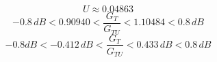 \[
	U \approx	0.04863
\]
\[
-0.8 \,dB < 0.90940 < \frac{G_T}{G_{TU}} < 1.10484 < 0.8 \,dB
\]
\[
-0.8 dB < -0.412 \,dB< \frac{G_T}{G_{TU}} < 0.433 \,dB< 0.8 \,dB
\]
